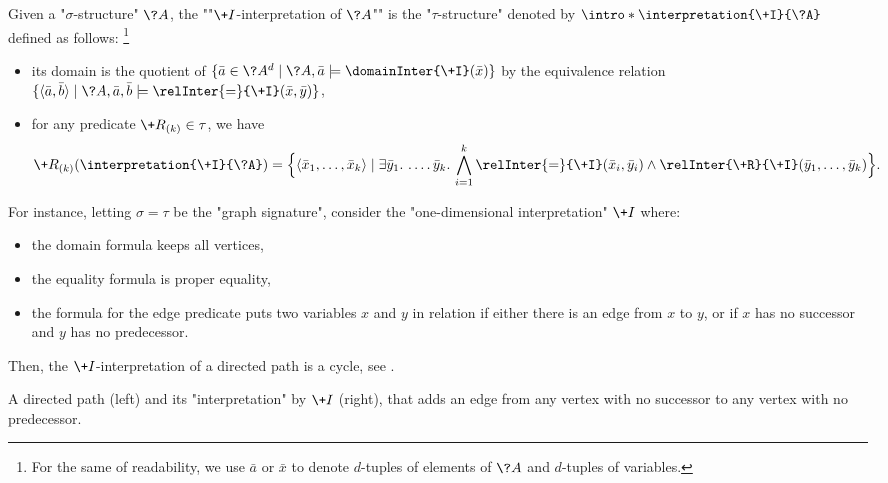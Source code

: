 Given a "$\sigma$-structure" $\?A$, the \AP""$\+I$-interpretation of $\?A$"" is the "$\tau$-structure" denoted by \AP$\intro*\interpretation{\+I}{\?A}$ defined as follows:%
\footnote{For the same of readability, we use $\bar a$ or $\bar x$ to
denote $d$-tuples of elements of $\?A$ and $d$-tuples of variables.}
\begin{itemize}
	\item its domain is the quotient of 
		$\{\bar a \in \?A^d \mid \?A, \bar a \models \domainInter{\+I}(\bar x)\}$
		by the equivalence relation
		$\set{\tup{\bar a, \bar b} \mid \?A, \bar a, \bar b \models \relInter{=}{\+I}(\bar x, \bar y)}$,
	\item for any predicate $\+R_{(k)} \in \tau$,
		we have
		\[
			\+R_{(k)}(\interpretation{\+I}{\?A}) =
			\Big\{\tup{\bar x_1, \hdots, \bar x_k} \mid
				\exists \bar y_1.\, \hdots.\, \bar y_k.\,
				\bigwedge_{i=1}^k \relInter{=}{\+I}(\bar x_i, \bar y_i)
				\land \relInter{\+R}{\+I}(\bar y_1, \hdots, \bar y_k)
			\Big\}.
		\]
\end{itemize}
For instance, letting $\sigma =\tau$ be the "graph signature", consider
the "one-dimensional interpretation" $\+I$ where:
\begin{itemize}
	\item the domain formula keeps all vertices,
	\item the equality formula is proper equality,
	\item the formula for the edge predicate puts two variables $x$ and $y$ in relation
		if either there is an edge from $x$ to $y$, or if $x$ has no successor and $y$ has no predecessor.
\end{itemize}
Then, the $\+I$-interpretation of a directed path is a cycle,
see .
\begin{marginfigure}
	\centering
	\qquad
	\caption{
		\AP\label{fig:interpretation-path-into-cycle}
		A directed path (left) and its "interpretation" by $\+I$ (right),
		that adds an edge from any vertex with no successor to any vertex with no predecessor.
	}
\end{marginfigure}

